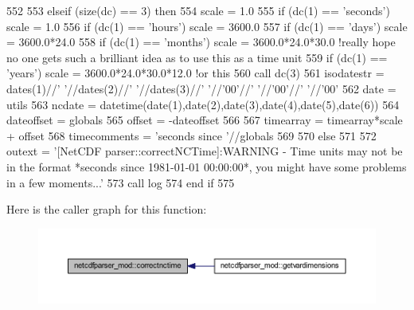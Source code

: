 \begin{DoxyCode}
552     
553     \textcolor{keywordflow}{elseif} (\textcolor{keyword}{size}(dc) == 3) \textcolor{keywordflow}{then}
554         scale = 1.0
555         \textcolor{keywordflow}{if} (dc(1) == \textcolor{stringliteral}{'seconds'}) scale = 1.0
556         \textcolor{keywordflow}{if} (dc(1) == \textcolor{stringliteral}{'hours'})   scale = 3600.0
557         \textcolor{keywordflow}{if} (dc(1) == \textcolor{stringliteral}{'days'})    scale = 3600.0*24.0
558         \textcolor{keywordflow}{if} (dc(1) == \textcolor{stringliteral}{'months'})  scale = 3600.0*24.0*30.0 \textcolor{comment}{!really hope no one gets such a brilliant idea as
       to use this as a time unit}
559         \textcolor{keywordflow}{if} (dc(1) == \textcolor{stringliteral}{'years'})   scale = 3600.0*24.0*30.0*12.0 \textcolor{comment}{!or this}
560         \textcolor{keyword}{call }dc(3)%
561         isodatestr = dates(1)//\textcolor{stringliteral}{' '}//dates(2)//\textcolor{stringliteral}{' '}//dates(3)//\textcolor{stringliteral}{' '}//\textcolor{stringliteral}{'00'}//\textcolor{stringliteral}{' '}//\textcolor{stringliteral}{'00'}//\textcolor{stringliteral}{' '}//\textcolor{stringliteral}{'00'}
562         date = utils%
563         ncdate = datetime(date(1),date(2),date(3),date(4),date(5),date(6))
564         dateoffset = globals%
565         offset = -dateoffset%
566         
567         timearray = timearray*scale + offset
568         timecomments = \textcolor{stringliteral}{'seconds since '}//globals%
569         
570     \textcolor{keywordflow}{else}       
571 
572         outext = \textcolor{stringliteral}{'[NetCDF parser::correctNCTime]:WARNING - Time units may not be in the format *seconds
       since 1981-01-01 00:00:00*, you might have some problems in a few moments...'}
573         \textcolor{keyword}{call }log%
574 \textcolor{keywordflow}{    end if}
575 
\end{DoxyCode}
Here is the caller graph for this function\+:\nopagebreak
\begin{figure}[H]
\begin{center}
\leavevmode
\includegraphics[width=350pt]{namespacenetcdfparser__mod_af93319fde6cf6baedb7fe27bf3396e7b_icgraph}
\end{center}
\end{figure}
\mbox{\label{namespacenetcdfparser__mod_a5fcd4b7fb27dbc9befd0a6fcfb9929a1}} 
